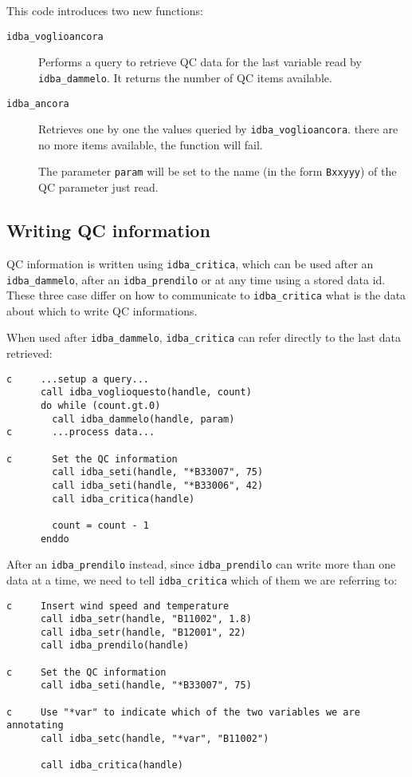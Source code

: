 \documentclass[draft,12pt,a4paper,twoside]{book}
\begin{document}
This code introduces two new functions:

\begin{description}
\item[{\tt idba\_voglioancora}]
  Performs a query to retrieve QC data for the last variable read by
  {\tt idba\_dammelo}.  It returns the number of QC items available.
\item[{\tt idba\_ancora}]
  Retrieves one by one the values queried by {\tt idba\_voglioancora}.
  there are no more items available, the function will fail.

  The parameter {\tt param} will be set to the name (in the form {\tt *Bxxyyy}) of
  the QC parameter just read.
\end{description}

\subsection{Writing QC information}

\label{fun-idba_critica}

QC information is written using {\tt idba\_critica}, which can be used after an
{\tt idba\_dammelo}, after an {\tt idba\_prendilo} or at any time using a stored data
id.  These three case differ on how to communicate to {\tt idba\_critica} what is
the data about which to write QC informations.

When used after {\tt idba\_dammelo}, {\tt idba\_critica} can refer directly to the
last data retrieved:

\begin{verbatim}
c     ...setup a query...
      call idba_voglioquesto(handle, count)
      do while (count.gt.0)
        call idba_dammelo(handle, param)
c       ...process data...

c       Set the QC information
        call idba_seti(handle, "*B33007", 75)
        call idba_seti(handle, "*B33006", 42)
        call idba_critica(handle)

        count = count - 1
      enddo
\end{verbatim}

After an {\tt idba\_prendilo} instead, since {\tt idba\_prendilo} can write more than
one data at a time, we need to tell {\tt idba\_critica} which of them we are
referring to:

\begin{verbatim}
c     Insert wind speed and temperature
      call idba_setr(handle, "B11002", 1.8)
      call idba_setr(handle, "B12001", 22)
      call idba_prendilo(handle)

c     Set the QC information
      call idba_seti(handle, "*B33007", 75)

c     Use "*var" to indicate which of the two variables we are annotating
      call idba_setc(handle, "*var", "B11002")

      call idba_critica(handle)
\end{verbatim}
\end{document}
